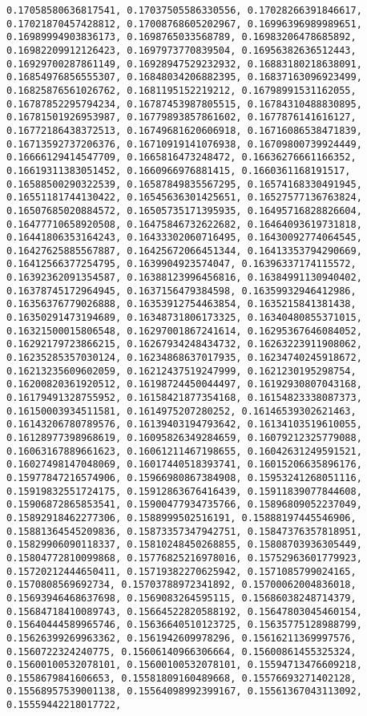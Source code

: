 \documentclass[11pt]{article}
\begin{document}
\begin{Verbatim}[commandchars=\\\{\}]
0.17058580636817541, 0.17037505586330556, 0.17028266391846617, 0.17021870457428812, 0.17008768605202967, 0.16996396989989651, 0.16989994903836173, 0.1698765033568789, 0.16983206478685892, 0.16982209912126423, 0.1697973770839504, 0.16956382636512443, 0.16929700287861149, 0.16928947529232932, 0.16883180218638091, 0.16854976856555307, 0.16848034206882395, 0.16837163096923499, 0.16825876561026762, 0.1681195152219212, 0.16798991531162055, 0.16787852295794234, 0.16787453987805515, 0.16784310488830895, 0.16781501926953987, 0.16779893857861602, 0.1677876141616127, 0.16772186438372513, 0.16749681620606918, 0.16716086538471839, 0.16713592737206376, 0.16710919141076938, 0.16709800739924449, 0.16666129414547709, 0.1665816473248472, 0.16636276661166352, 0.16619311383051452, 0.1660966976881415, 0.1660361168191517, 0.16588500290322539, 0.16587849835567295, 0.16574168330491945, 0.16551181744130422, 0.16545636301425651, 0.16527577136763824, 0.16507685020884572, 0.16505735171395935, 0.16495716828826604, 0.16477710658920508, 0.16475846732622682, 0.16464093619731818, 0.16441806353164243, 0.16433302060716495, 0.16430092774064545, 0.16427625885567887, 0.16425672066451344, 0.16413353794290669, 0.16412566377254795, 0.1639904923574047, 0.16396337174115572, 0.16392362091354587, 0.16388123996456816, 0.16384991130940402, 0.16378745172964945, 0.1637156479384598, 0.16359932946412986, 0.16356376779026888, 0.16353912754463854, 0.1635215841381438, 0.16350291473194689, 0.16348731806173325, 0.16340480855371015, 0.16321500015806548, 0.16297001867241614, 0.16295367646084052, 0.16292179723866215, 0.16267934248434732, 0.16263223911908062, 0.16235285357030124, 0.16234868637017935, 0.16234740245918672, 0.16213235609602059, 0.16212437519247999, 0.1621230195298754, 0.16200820361920512, 0.16198724450044497, 0.16192930807043168, 0.16179491328755952, 0.16158421877354168, 0.16154823338087373, 0.16150003934511581, 0.1614975207280252, 0.16146539302621463, 0.16143206780789576, 0.16139403194793642, 0.16134103519610055, 0.16128977398968619, 0.16095826349284659, 0.16079212325779088, 0.16063167889661623, 0.16061211467198655, 0.16042631249591521, 0.16027498147048069, 0.16017440518393741, 0.16015206635896176, 0.15977847216574906, 0.15966980867384908, 0.15953241268051116, 0.15919832551724175, 0.15912863676416439, 0.15911839077844608, 0.15906872865853541, 0.15900477934735766, 0.15896809052237049, 0.15892918462277306, 0.1588999502516191, 0.15888197445546906, 0.15881364545209836, 0.15873357347942751, 0.15847376357818951, 0.15829906090118337, 0.15810248450268855, 0.15808703936305449, 0.15804772810099868, 0.15776825216978016, 0.15752963601779923, 0.15720212444650411, 0.15719382270625942, 0.1571085799024165, 0.1570808569692734, 0.15703788972341892, 0.15700062004836018, 0.15693946468637698, 0.1569083264595115, 0.15686038248714379, 0.15684718410089743, 0.15664522820588192, 0.15647803045460154, 0.15640444589965746, 0.15636640510123725, 0.15635775128988799, 0.15626399269963362, 0.1561942609978296, 0.15616211369997576, 0.1560722324240775, 0.15606140966306664, 0.15600861455325324, 0.15600100532078101, 0.15600100532078101, 0.15594713476609218, 0.1558679841606653, 0.15581809160489668, 0.15576693271402128, 0.15568957539001138, 0.15564098992399167, 0.15561367043113092, 0.15559442218017722, 
\end{Verbatim}
\end{document}
